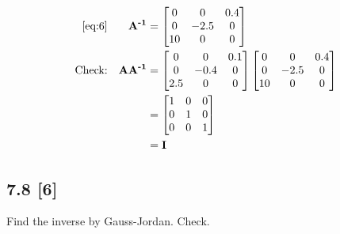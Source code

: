 \documentclass{article}
\begin{document}
\begin{align}
    \eqref{eq:6} && \textbf{A\textsuperscript{-1}} &= \begin{bmatrix}
    0 & 0 & 0.4\\
    0 & -2.5 & 0\\
    10 & 0 & 0
    \end{bmatrix}
    \\
    \label{eq:8}
    \text{Check:} && \textbf{AA\textsuperscript{-1}} &= \begin{bmatrix}
    0&0&0.1\\
    0&-0.4&0\\
    2.5&0&0
    \end{bmatrix}\begin{bmatrix}
    0 & 0 & 0.4\\
    0 & -2.5 & 0\\
    10 & 0 & 0
    \end{bmatrix}
    \\
    \label{eq:9}
    && &= \begin{bmatrix}
    1&0&0\\
    0&1&0\\
    0&0&1
    \end{bmatrix}
    \\
    \label{eq:10}
    && &= \textbf{I}
\end{align}

\subsection*{7.8 [6]}
\setcounter{equation}{0}

Find the inverse by Gauss-Jordan. Check.
\end{document}
